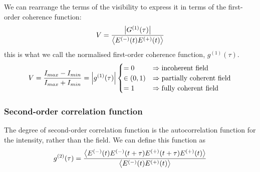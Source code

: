 \begin{defi}
	We can rearrange the terms of the visibility to express it in terms of the first-order coherence function:
	\begin{align*}
		V = \dfrac{\abs{G^{(1)}(\tau)}}{\ev{E^{(-)}(t) E^{(+)}(t)}}
	\end{align*}
	this is what we call the normalised first-order coherence function, $g^{(1)}(\tau)$.
	\begin{align}
		V = \frac{I_{max} - I_{min}}{I_{max} + I_{min}} = \abs{g^{(1)}(\tau)}
		\begin{cases}
			= 0 & \Rightarrow \text{incoherent field} \\
			\in (0,1) & \Rightarrow \text{partially coherent field} \\
			= 1 & \Rightarrow \text{fully coherent field}
		\end{cases}
	\end{align}
\end{defi}

\subsubsection*{Second-order correlation function}
\begin{defi}
	The degree of second-order correlation function is the autocorrelation function for the intensity, rather than the field. We can define this function as
	\begin{align}
		g^{(2)}(\tau) = \frac{\ev{ E^{(-)}(t) E^{(-)}(t + \tau) E^{(+)}(t + \tau) E^{(+)}(t) }}{\ev{ E^{(-)}(t) E^{(+)}(t) }}
	\end{align}
\end{defi}

